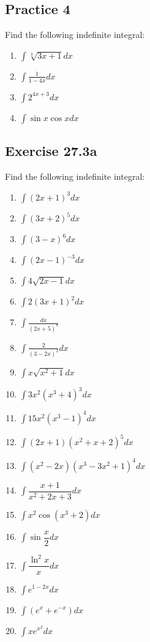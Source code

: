 \documentclass{report}
\begin{document}
\subsection{Practice 4}
Find the following indefinite integral:
\begin{enumerate}
    \item $\displaystyle\int{\sqrt[3]{3x+1}}dx$
    \item $\displaystyle\int\frac{1}{1-4x}dx$
    \item $\displaystyle\int2^{4x+3}dx$
    \item $\displaystyle\int\sin x\cos xdx$
\end{enumerate}

\subsection{Exercise 27.3a}
Find the following indefinite integral:
\begin{enumerate}
    \item $\displaystyle\int(2x+1)^{3} dx$
    \item $\displaystyle\int(3x+2)^{5} dx$
    \item $\displaystyle\int(3-x)^{6} dx$
    \item $\displaystyle\int(2x-1)^{-3} dx$
    \item $\displaystyle\int4{\sqrt{2x-1}} dx$
    \item $\displaystyle\int2(3x+1)^{2} dx$
    \item $\displaystyle\int\frac{dx}{(2x+5)^{8}}$
    \item $\displaystyle\int\frac{2}{(3-2x)^{2}} dx$
    \item $\displaystyle\int x{\sqrt{x^{2}+1}} dx$
    \item $\displaystyle\int 3x^{2}\left(x^{3}+4\right)^{3} dx$
    \item $\displaystyle\int15x^{2}\left(x^{3}-1\right)^{4} dx$
    \item $\displaystyle\int\left(2x+1\right)\!\left(x^{2}+x\!+\!2\right)^{5} dx$
    \item $\displaystyle\int\left(x^{2}-2x\right)\left(x^{3}-3x^{2}+1\right)^{4} dx$
    \item $\displaystyle\int\dfrac{x+1}{{{x}^{2}}+2x+3} dx$
    \item $\displaystyle\int x^{2}\cos\left(x^{3}+2\right) dx$
    \item $\displaystyle\int\sin{\dfrac{x}{2}} dx$
    \item $\displaystyle\int\dfrac{\ln^2 x}{x} dx$
    \item $\displaystyle\int e^{1 - 2x} dx$
    \item $\displaystyle\int\left(e^{x}+e^{-x}\right) dx$
    \item $\displaystyle\int x e^{x^2} dx$
\end{enumerate}
\end{document}
